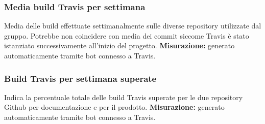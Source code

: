 \subsubsection{Media build Travis per settimana}
Media delle build effettuate settimanalmente sulle diverse repository utilizzate dal gruppo. Potrebbe non coincidere con media dei commit siccome Travis è stato istanziato successivamente all’inizio del progetto.\newline \newline
\textbf{Misurazione:} generato automaticamente tramite bot connesso a Travis.\\
\subsubsection{Build Travis per settimana superate}
Indica la percentuale totale delle build Travis superate per le due repository Github per documentazione e per il prodotto.\newline \newline 
\textbf{Misurazione:} generato automaticamente tramite bot connesso a Travis.\\
